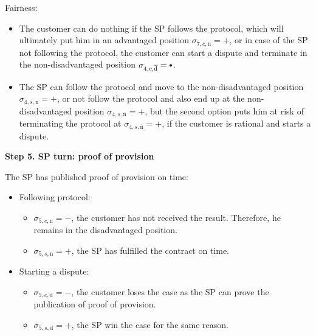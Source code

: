 \documentclass{ieeeaccess}
\newcommand\sbullet[1][.75]{\mathbin{\ThisStyle{\vcenter{\hbox{%
  \scalebox{#1}{$\SavedStyle\bullet$}}}}}%
}
\begin{document}
Fairness:

\begin{itemize}

\item
  The customer can do nothing if the SP follows the protocol, which will ultimately put him in an advantaged position \(\sigma_{7, c, \mathrm{n}} = +\), or in case of the SP not following the protocol, the customer can start a dispute and terminate in the non-disadvantaged position \(\sigma_{4, c, \overline{\mathrm{d}}} = \sbullet\).
\item
  The SP can follow the protocol and move to the non-disadvantaged position \(\sigma_{4, s, \mathrm{n}} = +\), or not follow the protocol and also end up at the non-disadvantaged position \(\sigma_{4, s, \overline{\mathrm{n}}} = +\), but the second option puts him at risk of terminating the protocol at \(\sigma_{4, s, \overline{\mathrm{n}}} = +\), if the customer is rational and starts a dispute.
\end{itemize}

\noindent \textbf
{Step 5. SP turn: proof of provision}\label{step-5-publication-of-proof-of-provision}

The SP has published proof of provision on time:

\begin{itemize}
\item
  Following protocol:

  \begin{itemize}
  
  \item
    \(\sigma_{5, c, \mathrm{n}} = -\), the customer has not received the result. Therefore, he remains in the disadvantaged position. 
  \item
    \(\sigma_{5, s, \mathrm{n}} = +\), the SP has fulfilled the contract on time.
  \end{itemize}
\item
  Starting a dispute:

  \begin{itemize}
  
  \item
    \(\sigma_{5, c, \mathrm{d}} = -\), the customer loses the case as the SP can prove the publication of proof of provision. 
  \item
    \(\sigma_{5, s, \mathrm{d}} = +\), the SP win the case for the same reason.
  \end{itemize}
\end{itemize}
\end{document}
